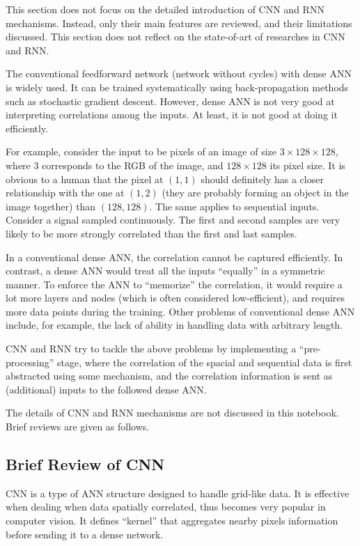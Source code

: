This section does not focus on the detailed introduction of CNN and RNN mechanisms. Instead, only their main features are reviewed, and their limitations discussed. This section does not reflect on the state-of-art of researches in CNN and RNN.

The conventional feedforward network (network without cycles) with dense ANN is widely used. It can be trained systematically using back-propagation methods such as stochastic gradient descent. However, dense ANN is not very good at interpreting correlations among the inputs. At least, it is not good at doing it efficiently.

For example, consider the input to be pixels of an image of size $3\times 128 \times 128$, where $3$ corresponds to the RGB of the image, and $128 \times 128$ its pixel size. It is obvious to a human that the pixel at $(1,1)$ should definitely has a closer relationship with the one at $(1,2)$ (they are probably forming an object in the image together) than $(128, 128)$. The same applies to sequential inputs. Consider a signal sampled continuously. The first and second samples are very likely to be more strongly correlated than the first and last samples.

In a conventional dense ANN, the correlation cannot be captured efficiently. In contrast, a dense ANN would treat all the inputs ``equally'' in a symmetric manner. To enforce the ANN to ``memorize'' the correlation, it would require a lot more layers and nodes (which is often considered low-efficient), and requires more data points during the training. Other problems of conventional dense ANN include, for example, the lack of ability in handling data with arbitrary length.

CNN and RNN try to tackle the above problems by implementing a ``pre-processing'' stage, where the correlation of the spacial and sequential data is first abstracted using some mechanism, and the correlation information is sent as (additional) inputs to the followed dense ANN.

The details of CNN and RNN mechanisms are not discussed in this notebook. Brief reviews are given as follows.

\subsection{Brief Review of CNN}

CNN is a type of ANN structure designed to handle grid-like data. It is effective when dealing when data spatially correlated, thus becomes very popular in computer vision. It defines ``kernel'' that aggregates nearby pixels information before sending it to a dense network.

